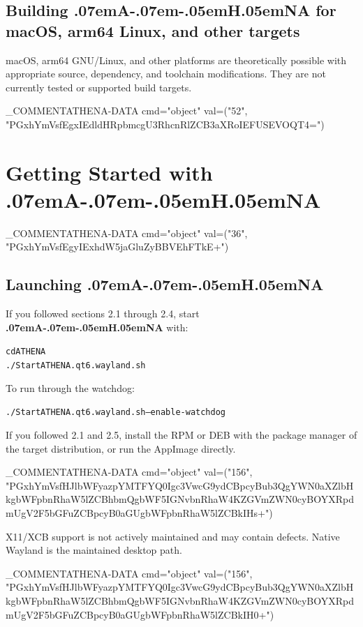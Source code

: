 \documentclass{article}
\newcommand{\ATHENA}{\textbf{\kern.07emA\kern-.07em\raisebox{.25ex}{\scalebox{.7}{T}}\kern-.05emH\kern.05em\raisebox{-.25ex}{\scalebox{.7}{E}}NA}}
\newenvironment{tmcode}[1][]{\begin{alltt} }{\end{alltt}}
{\theorembodyfont{\rmfamily}\newtheorem{remark}{Remark}}
\begin{document}
\subsection{Building {\ATHENA} for macOS, arm64 Linux, and other targets}

macOS, arm64 GNU/Linux, and other platforms are theoretically possible with
appropriate source, dependency, and toolchain modifications. They are not
currently tested or supported build targets.

\INLINE_COMMENT{ATHENA-DATA cmd="object" val=("52", "PGxhYmVsfEgxIEdldHRpbmcgU3RhcnRlZCB3aXRoIEFUSEVOQT4=")}

\section{Getting Started with {\ATHENA}}

\INLINE_COMMENT{ATHENA-DATA cmd="object" val=("36", "PGxhYmVsfEgyIExhdW5jaGluZyBBVEhFTkE+")}

\subsection{Launching {\ATHENA}}

If you followed sections 2.1 through 2.4, start {\ATHENA} with:
\begin{tmcode}
cd ATHENA
./StartATHENA.qt6.wayland.sh
\end{tmcode}
To run through the watchdog:
\begin{tmcode}
./StartATHENA.qt6.wayland.sh --enable-watchdog
\end{tmcode}
If you followed 2.1 and 2.5, install the RPM or DEB with the package manager
of the target distribution, or run the AppImage directly.

\INLINE_COMMENT{ATHENA-DATA cmd="object" val=("156", "PGxhYmVsfHJlbWFyazpYMTFYQ0Igc3VwcG9ydCBpcyBub3QgYWN0aXZlbHkgbWFpbnRhaW5lZCBhbmQgbWF5IGNvbnRhaW4KZGVmZWN0cyBOYXRpdmUgV2F5bGFuZCBpcyB0aGUgbWFpbnRhaW5lZCBkIHs+")}

\begin{remark}
  X11/XCB support is not actively maintained and may contain defects. Native
  Wayland is the maintained desktop path.
\end{remark}

\INLINE_COMMENT{ATHENA-DATA cmd="object" val=("156", "PGxhYmVsfHJlbWFyazpYMTFYQ0Igc3VwcG9ydCBpcyBub3QgYWN0aXZlbHkgbWFpbnRhaW5lZCBhbmQgbWF5IGNvbnRhaW4KZGVmZWN0cyBOYXRpdmUgV2F5bGFuZCBpcyB0aGUgbWFpbnRhaW5lZCBkIH0+")}
\end{document}

